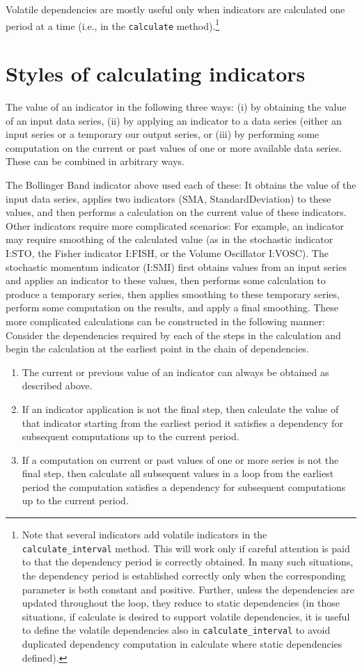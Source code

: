 \documentclass[11pt,twoside]{article}
\begin{document}
Volatile dependencies are mostly useful only when indicators are
calculated one period at a time (i.e., in the
\lstinline!calculate! method).\footnote{Note that several
indicators add volatile indicators in the
\lstinline!calculate_interval! method. This will work only if
careful attention is paid to that the dependency period is correctly
obtained. In many such situations, the dependency period is established
correctly only when the corresponding parameter is both constant and
positive. Further, unless the dependencies are updated throughout the
loop, they reduce to static dependencies (in those situations, if
calculate is desired to support volatile dependencies, it is useful to
define the volatile dependencies also in \lstinline!calculate_interval!
to avoid duplicated dependency computation in calculate where static
dependencies defined).}

\section{Styles of calculating indicators}
The value of an indicator in the following three ways: (i) by obtaining
the value of an input data series, (ii) by applying an indicator to a
data series (either an input series or a temporary our output series,
or (iii) by performing some computation on the current or past values
of one or more available data series. These can be combined in
arbitrary ways.

The Bollinger Band indicator above used each of these: It obtains the
value of the input data series, applies two indicators (SMA,
StandardDeviation) to these values, and then performs a calculation on
the current value of these indicators. Other indicators require more
complicated scenarios: For example, an indicator may require smoothing
of the calculated value (as in the stochastic indicator I:STO, the
Fisher indicator I:FISH, or the Volume Oscillator I:VOSC). The
stochastic momentum indicator (I:SMI) first obtains values from an
input series and applies an indicator to these values, then performs
some calculation to produce a temporary series, then applies smoothing
to these temporary series, perform some computation on the results, and
apply a final smoothing. These more complicated calculations can be
constructed in the following manner: Consider the dependencies required
by each of the steps in the calculation and begin the calculation at
the earliest point in the chain of dependencies.

\begin{enumerate}
\item The current or previous value of an indicator can always be obtained
as described above.
\item If an indicator application is not the final step, then calculate the
value of that indicator starting from the earliest period it satisfies
a dependency for subsequent computations up to the current period.
\item If a computation on current or past values of one or more series is
not the final step, then calculate all subsequent values in a loop from
the earliest period the computation satisfies a dependency for
subsequent computations up to the current period.
\end{enumerate}
\end{document}
